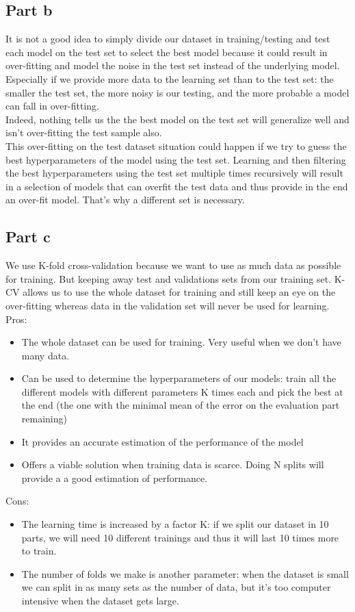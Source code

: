 \documentclass[a4paper, 10pt]{article}
\begin{document}
\subsection{Part b}
It is not a good idea to simply divide our dataset in training/testing and
test each model on the test set to select the best model because it could result in over-fitting
and model the noise in the test set instead of the underlying model. Especially if we 
provide more data to the learning set than to the test set: the smaller the test set,
the more noisy is our testing, and the more probable a model can fall in over-fitting.
\\
Indeed, nothing tells us the the best model on the test set will generalize well and isn't 
over-fitting the test sample also.
\\
This over-fitting on the test dataset situation could happen if we try to guess the best hyperparameters of
the model using the test set. Learning and then filtering the best hyperparameters using the test set
multiple times recursively will result in a selection of models that can overfit the test data and thus 
provide in the end an over-fit model. That's why a different set is necessary.

\subsection{Part c}
We use K-fold cross-validation because we want to use as much data as possible for training.
But keeping away test and validations sets from our training set. K-CV allows us to use the whole
dataset for training and still keep an eye on the over-fitting whereas data in the validation set will never
be used for learning.
\\
Pros: 
\begin{itemize}
    \item The whole dataset can be used for training. Very useful when we don't have many data.
    \item Can be used to determine the hyperparameters of our models: train all the
    different models with different parameters K times each and pick the best at the end
    (the one with the minimal mean of the error on the evaluation part remaining)
    \item It provides an accurate estimation of the performance of the model
    \item Offers a viable solution when training data is scarce. Doing N splits will provide a a good estimation of 
    performance.
\end{itemize}
Cons:
\begin{itemize}
    \item The learning time is increased by a factor K: if we split our dataset in 10 parts, we 
    will need 10 different trainings and thus it will last 10 times more to train.
    \item The number of folds we make is another parameter: when the dataset is small we can split in
    as many sets as the number of data, but it's too computer intensive when the dataset gets large.

\end{itemize}
\end{document}
